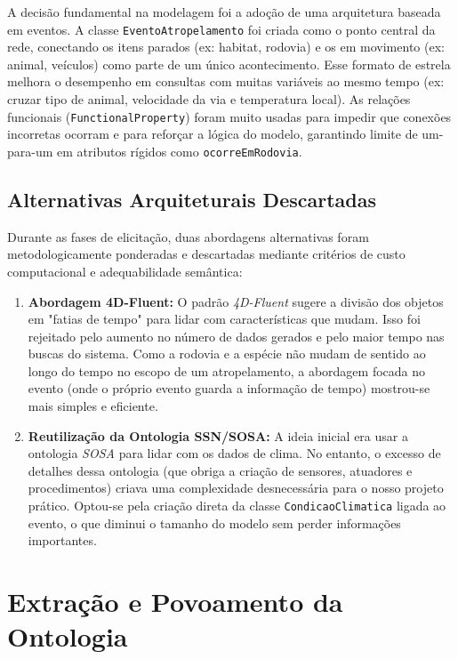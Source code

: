 \documentclass[10pt,conference]{IEEEtran}
\begin{document}
A decisão fundamental na modelagem foi a adoção de uma arquitetura baseada em eventos. A classe \texttt{EventoAtropelamento} foi criada como o ponto central da rede, conectando os itens parados (ex: habitat, rodovia) e os em movimento (ex: animal, veículos) como parte de um único acontecimento. Esse formato de estrela melhora o desempenho em consultas com muitas variáveis ao mesmo tempo (ex: cruzar tipo de animal, velocidade da via e temperatura local). As relações funcionais (\texttt{FunctionalProperty}) foram muito usadas para impedir que conexões incorretas ocorram e para reforçar a lógica do modelo, garantindo limite de um-para-um em atributos rígidos como \texttt{ocorreEmRodovia}.

\subsection{Alternativas Arquiteturais Descartadas}

Durante as fases de elicitação, duas abordagens alternativas foram metodologicamente ponderadas e descartadas mediante critérios de custo computacional e adequabilidade semântica:

\begin{enumerate}
    \item \textbf{Abordagem 4D-Fluent:} O padrão \textit{4D-Fluent} sugere a divisão dos objetos em "fatias de tempo" para lidar com características que mudam. Isso foi rejeitado pelo aumento no número de dados gerados e pelo maior tempo nas buscas do sistema. Como a rodovia e a espécie não mudam de sentido ao longo do tempo no escopo de um atropelamento, a abordagem focada no evento (onde o próprio evento guarda a informação de tempo) mostrou-se mais simples e eficiente.
    
    \item \textbf{Reutilização da Ontologia SSN/SOSA:} A ideia inicial era usar a ontologia \textit{SOSA} para lidar com os dados de clima. No entanto, o excesso de detalhes dessa ontologia (que obriga a criação de sensores, atuadores e procedimentos) criava uma complexidade desnecessária para o nosso projeto prático. Optou-se pela criação direta da classe \texttt{CondicaoClimatica} ligada ao evento, o que diminui o tamanho do modelo sem perder informações importantes.
\end{enumerate}

\section{Extração e Povoamento da Ontologia}
\end{document}
